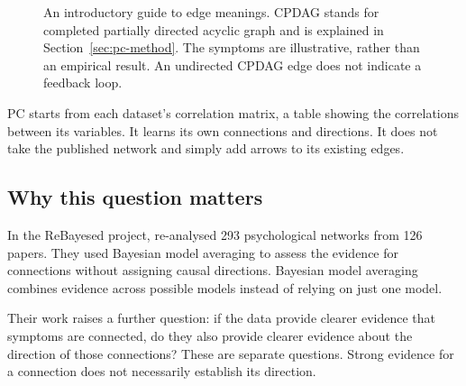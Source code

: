 \documentclass[11pt,a4paper]{article}
\begin{document}
\begin{figure}[!htbp]
\centering
{}
\caption{An introductory guide to edge meanings. CPDAG stands for completed partially directed acyclic graph and is explained in Section~\ref{sec:pc-method}. The symptoms are illustrative, rather than an empirical result. An undirected CPDAG edge does not indicate a feedback loop.}
\label{fig:edges}
\end{figure}
\FloatBarrier

PC starts from each dataset's correlation matrix, a table showing the correlations between its variables. It learns its own connections and directions. It does not take the published network and simply add arrows to its existing edges.

\subsection{Why this question matters}
In the ReBayesed project, \citet{huth2026} re-analysed 293 psychological networks from 126 papers. They used Bayesian model averaging to assess the evidence for connections without assigning causal directions. Bayesian model averaging combines evidence across possible models instead of relying on just one model.

Their work raises a further question: if the data provide clearer evidence that symptoms are connected, do they also provide clearer evidence about the direction of those connections? These are separate questions. Strong evidence for a connection does not necessarily establish its direction.
\end{document}
